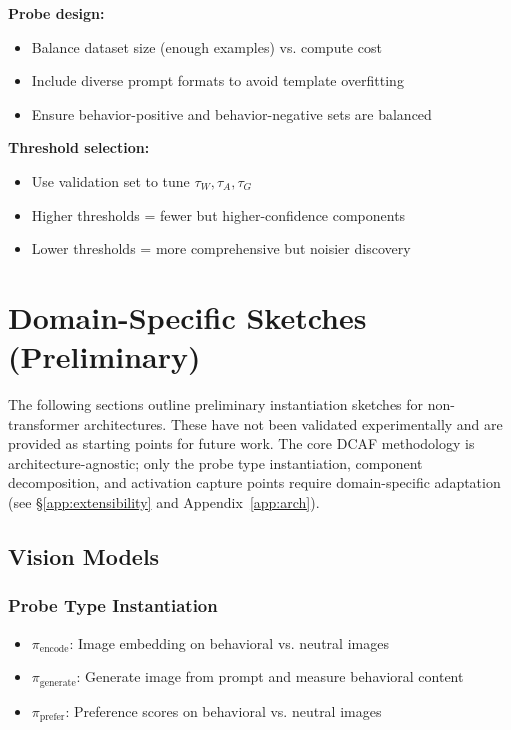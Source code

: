 \documentclass[11pt]{article}
\begin{document}
\noindent\textbf{Probe design:}
\begin{itemize}[nosep]
\item Balance dataset size (enough examples) vs. compute cost
\item Include diverse prompt formats to avoid template overfitting
\item Ensure behavior-positive and behavior-negative sets are balanced
\end{itemize}

\noindent\textbf{Threshold selection:}
\begin{itemize}[nosep]
\item Use validation set to tune $\tau_W, \tau_A, \tau_G$
\item Higher thresholds = fewer but higher-confidence components
\item Lower thresholds = more comprehensive but noisier discovery
\end{itemize}

\section{Domain-Specific Sketches (Preliminary)}
\label{sec:domain-sketches}

The following sections outline preliminary instantiation sketches for non-transformer architectures. These have not been validated experimentally and are provided as starting points for future work. The core DCAF methodology is architecture-agnostic; only the probe type instantiation, component decomposition, and activation capture points require domain-specific adaptation (see \S\ref{app:extensibility} and Appendix~\ref{app:arch}).

\subsection{Vision Models}
\label{app:vision-models}

\subsubsection{Probe Type Instantiation}
\label{app:vision-probe-type-instantiation}

\begin{itemize}[nosep]
\item $\pi_{\text{encode}}$: Image embedding on behavioral vs. neutral images
\item $\pi_{\text{generate}}$: Generate image from prompt and measure behavioral content
\item $\pi_{\text{prefer}}$: Preference scores on behavioral vs. neutral images
\end{itemize}
\end{document}
